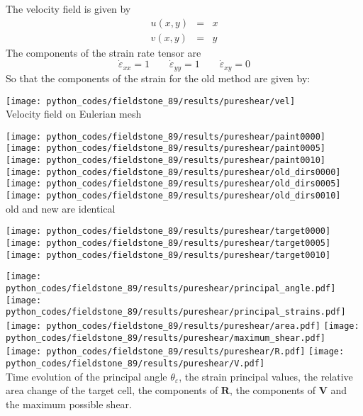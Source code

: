 The velocity field is given by
\begin{eqnarray}
u(x,y)&=&x \nonumber\\
v(x,y)&=&y \nonumber
\end{eqnarray}
The components of the strain rate tensor are
\[
\dot\varepsilon_{xx} = 1 
\qquad
\dot\varepsilon_{yy} = 1
\qquad
\dot\varepsilon_{xy} = 0 
\]
So that the components of the strain for the old method are given by:




\begin{center}
\texttt{[image: python\_codes/fieldstone\_89/results/pureshear/vel]}\\
{\captionfont Velocity field on Eulerian mesh}
\end{center}

\begin{center}
\texttt{[image: python\_codes/fieldstone\_89/results/pureshear/paint0000]}
\texttt{[image: python\_codes/fieldstone\_89/results/pureshear/paint0005]}
\texttt{[image: python\_codes/fieldstone\_89/results/pureshear/paint0010]}\\
\texttt{[image: python\_codes/fieldstone\_89/results/pureshear/old\_dirs0000]}
\texttt{[image: python\_codes/fieldstone\_89/results/pureshear/old\_dirs0005]}
\texttt{[image: python\_codes/fieldstone\_89/results/pureshear/old\_dirs0010]}\\
{\captionfont old and new are identical}
\end{center}

\begin{center}
\texttt{[image: python\_codes/fieldstone\_89/results/pureshear/target0000]}
\texttt{[image: python\_codes/fieldstone\_89/results/pureshear/target0005]}
\texttt{[image: python\_codes/fieldstone\_89/results/pureshear/target0010]}
\end{center}


\begin{center}
\texttt{[image: python\_codes/fieldstone\_89/results/pureshear/principal\_angle.pdf]}
\texttt{[image: python\_codes/fieldstone\_89/results/pureshear/principal\_strains.pdf]}\\
\texttt{[image: python\_codes/fieldstone\_89/results/pureshear/area.pdf]}
\texttt{[image: python\_codes/fieldstone\_89/results/pureshear/maximum\_shear.pdf]}\\
\texttt{[image: python\_codes/fieldstone\_89/results/pureshear/R.pdf]}
\texttt{[image: python\_codes/fieldstone\_89/results/pureshear/V.pdf]}\\
{\captionfont Time evolution of the principal angle $\theta_\varepsilon$, 
the strain principal values, the relative area change of the target cell, 
the components of ${\bm R}$, the components of ${\bm V}$ and the maximum
possible shear.}
\end{center}

